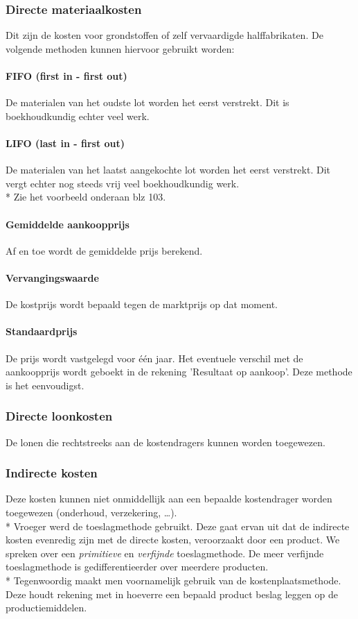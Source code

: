 \documentclass[12pt]{article}
\begin{document}
\subsubsection{Directe materiaalkosten}
Dit zijn de kosten voor grondstoffen of zelf vervaardigde halffabrikaten. De volgende methoden kunnen hiervoor gebruikt worden:
\paragraph{FIFO (first in - first out)}
De materialen van het oudste lot worden het eerst verstrekt. Dit is boekhoudkundig echter veel werk.
\paragraph{LIFO (last in - first out)}
De materialen van het laatst aangekochte lot worden het eerst verstrekt. Dit vergt echter nog steeds vrij veel boekhoudkundig werk.\\*
Zie het voorbeeld onderaan blz 103.
\paragraph{Gemiddelde aankoopprijs}
Af en toe wordt de gemiddelde prijs berekend.
\paragraph{Vervangingswaarde}
De kostprijs wordt bepaald tegen de marktprijs op dat moment.
\paragraph{Standaardprijs}
De prijs wordt vastgelegd voor \'e\'en jaar. Het eventuele verschil met de aankoopprijs wordt geboekt in de rekening 'Resultaat op aankoop'. Deze methode is het eenvoudigst.
\subsubsection{Directe loonkosten}
De lonen die rechtstreeks aan de kostendragers kunnen worden toegewezen.
\subsubsection{Indirecte kosten}
Deze kosten kunnen niet onmiddellijk aan een bepaalde kostendrager worden toegewezen (onderhoud, verzekering, \dots).\\*
Vroeger werd de toeslagmethode gebruikt. Deze gaat ervan uit dat de indirecte kosten evenredig zijn met de directe kosten, veroorzaakt door een product. We spreken over een \textit{primitieve} en \textit{verfijnde} toeslagmethode. De meer verfijnde toeslagmethode is gedifferentieerder over meerdere producten.\\*
Tegenwoordig maakt men voornamelijk gebruik van de kostenplaatsmethode. Deze houdt rekening met in hoeverre een bepaald product beslag leggen op de productiemiddelen.
\end{document}
